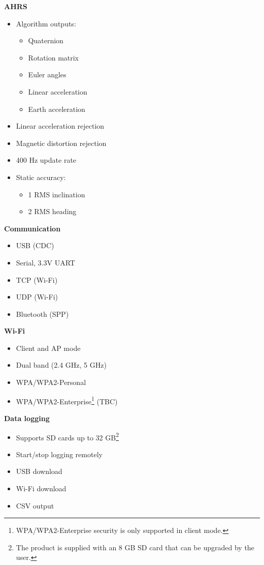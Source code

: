 \begin{multicols}{2}
\textbf{\acs{AHRS}}
\begin{itemize}[nolistsep]
    \item Algorithm outputs:
    \begin{itemize}
        \item Quaternion
        \item Rotation matrix
        \item Euler angles
        \item Linear acceleration
        \item Earth acceleration
    \end{itemize}
    \item Linear acceleration rejection
    \item Magnetic distortion rejection
    \item 400 Hz update rate
    \item Static accuracy:
        \begin{itemize}
            \item 1\textdegree{} \acs{RMS} inclination
            \item 2\textdegree{} \acs{RMS} heading
        \end{itemize}
\end{itemize}

\columnbreak

\textbf{Communication}
\begin{itemize}[nolistsep]
    \item \acs{USB} (\acs{CDC})
    \item Serial, 3.3V \acs{UART}
    \item \acs{TCP} (Wi-Fi)
    \item \acs{UDP} (Wi-Fi)
    \item Bluetooth (\acs{SPP})
\end{itemize}

\textbf{Wi-Fi}
\begin{itemize}[nolistsep]
    \item Client and \acs{AP} mode
    \item Dual band (2.4 GHz, 5 GHz)
    \item WPA/WPA2-Personal
    \item WPA/WPA2-Enterprise\footnote{WPA/WPA2-Enterprise security is only supported in client mode.} (TBC)
\end{itemize}

\textbf{Data logging}
\begin{itemize}[nolistsep]
    \item Supports \acs{SD} cards up to 32 GB\footnote{The product is supplied with an 8 GB \acs{SD} card that can be upgraded by the user.}
    \item Start/stop logging remotely
    \item USB download
    \item Wi-Fi download
    \item \acs{CSV} output
\end{itemize}


\end{multicols}

